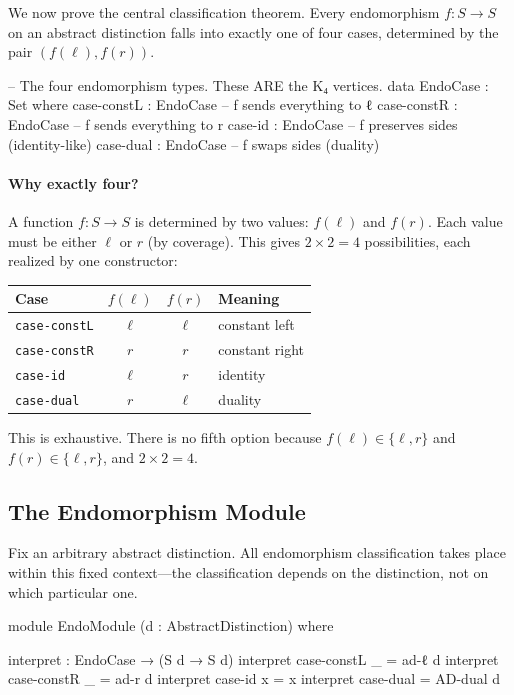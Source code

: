 \documentclass[11pt,a4paper]{book}
\begin{document}
We now prove the central classification theorem. Every endomorphism
$f : S \to S$ on an abstract distinction falls into exactly one of four cases,
determined by the pair $(f(\ell), f(r))$.

\begin{code}
-- The four endomorphism types. These ARE the K₄ vertices.
data EndoCase : Set where
  case-constL : EndoCase   -- f sends everything to ℓ
  case-constR : EndoCase   -- f sends everything to r
  case-id     : EndoCase   -- f preserves sides (identity-like)
  case-dual   : EndoCase   -- f swaps sides (duality)
\end{code}

\paragraph{Why exactly four?}
A function $f : S \to S$ is determined by two values: $f(\ell)$ and $f(r)$.
Each value must be either $\ell$ or $r$ (by coverage). This gives $2 \times 2 = 4$
possibilities, each realized by one constructor:
\begin{center}
\begin{tabular}{lccl}
\toprule
\textbf{Case} & $f(\ell)$ & $f(r)$ & \textbf{Meaning} \\
\midrule
\texttt{case-constL} & $\ell$ & $\ell$ & constant left \\
\texttt{case-constR} & $r$ & $r$ & constant right \\
\texttt{case-id}     & $\ell$ & $r$ & identity \\
\texttt{case-dual}   & $r$ & $\ell$ & duality \\
\bottomrule
\end{tabular}
\end{center}

This is exhaustive. There is no fifth option because $f(\ell) \in \{\ell, r\}$
and $f(r) \in \{\ell, r\}$, and $2 \times 2 = 4$.

\subsection{The Endomorphism Module}

Fix an arbitrary abstract distinction. All endomorphism classification takes place
within this fixed context---the classification depends on the distinction, not on
which particular one.

\begin{code}
module EndoModule (d : AbstractDistinction) where

  interpret : EndoCase → (S d → S d)
  interpret case-constL _ = ad-ℓ d
  interpret case-constR _ = ad-r d
  interpret case-id     x = x
  interpret case-dual     = AD-dual d
\end{code}
\end{document}
